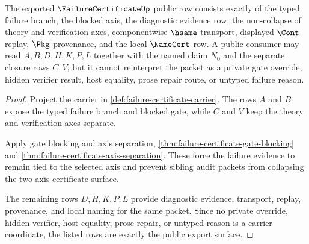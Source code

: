 \begin{theorem}
\label{thm:failurecertificate-public-axis-export}
The exported $\FailureCertificateUp$ public row consists exactly of the typed failure branch, the blocked axis, the diagnostic evidence row, the non-collapse of theory and verification axes, componentwise $\hsame$ transport, displayed $\Cont$ replay, $\Pkg$ provenance, and the local $\NameCert$ row. A public consumer may read $A,B,D,H,K,P,L$ together with the named claim $N_0$ and the separate closure rows $C,V$, but it cannot reinterpret the packet as a private gate override, hidden verifier result, host equality, prose repair route, or untyped failure reason.
\end{theorem}
\begin{proof}
Project the carrier in \autoref{def:failure-certificate-carrier}. The rows $A$ and $B$ expose the typed failure branch and blocked gate, while $C$ and $V$ keep the theory and verification axes separate.

Apply gate blocking and axis separation, \autoref{thm:failure-certificate-gate-blocking} and \autoref{thm:failure-certificate-axis-separation}. These force the failure evidence to remain tied to the selected axis and prevent sibling audit packets from collapsing the two-axis certificate surface.

The remaining rows $D,H,K,P,L$ provide diagnostic evidence, transport, replay, provenance, and local naming for the same packet. Since no private override, hidden verifier, host equality, prose repair, or untyped reason is a carrier coordinate, the listed rows are exactly the public export surface.
\end{proof}

